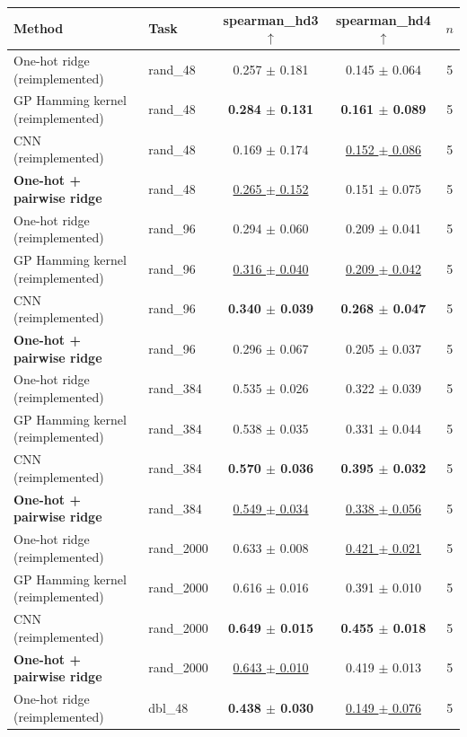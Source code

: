 \begin{tabular}{llccc}
\toprule
Method & Task & spearman\_hd3 $\uparrow$ & spearman\_hd4 $\uparrow$ & $n$ \\
\midrule
One-hot ridge (reimplemented) & rand\_48 & 0.257 $\pm$ 0.181 & 0.145 $\pm$ 0.064 & 5 \\
GP Hamming kernel (reimplemented) & rand\_48 & \textbf{0.284 $\pm$ 0.131} & \textbf{0.161 $\pm$ 0.089} & 5 \\
CNN (reimplemented) & rand\_48 & 0.169 $\pm$ 0.174 & \underline{0.152 $\pm$ 0.086} & 5 \\
\textbf{One-hot + pairwise ridge} & rand\_48 & \underline{0.265 $\pm$ 0.152} & 0.151 $\pm$ 0.075 & 5 \\
\midrule
One-hot ridge (reimplemented) & rand\_96 & 0.294 $\pm$ 0.060 & 0.209 $\pm$ 0.041 & 5 \\
GP Hamming kernel (reimplemented) & rand\_96 & \underline{0.316 $\pm$ 0.040} & \underline{0.209 $\pm$ 0.042} & 5 \\
CNN (reimplemented) & rand\_96 & \textbf{0.340 $\pm$ 0.039} & \textbf{0.268 $\pm$ 0.047} & 5 \\
\textbf{One-hot + pairwise ridge} & rand\_96 & 0.296 $\pm$ 0.067 & 0.205 $\pm$ 0.037 & 5 \\
\midrule
One-hot ridge (reimplemented) & rand\_384 & 0.535 $\pm$ 0.026 & 0.322 $\pm$ 0.039 & 5 \\
GP Hamming kernel (reimplemented) & rand\_384 & 0.538 $\pm$ 0.035 & 0.331 $\pm$ 0.044 & 5 \\
CNN (reimplemented) & rand\_384 & \textbf{0.570 $\pm$ 0.036} & \textbf{0.395 $\pm$ 0.032} & 5 \\
\textbf{One-hot + pairwise ridge} & rand\_384 & \underline{0.549 $\pm$ 0.034} & \underline{0.338 $\pm$ 0.056} & 5 \\
\midrule
One-hot ridge (reimplemented) & rand\_2000 & 0.633 $\pm$ 0.008 & \underline{0.421 $\pm$ 0.021} & 5 \\
GP Hamming kernel (reimplemented) & rand\_2000 & 0.616 $\pm$ 0.016 & 0.391 $\pm$ 0.010 & 5 \\
CNN (reimplemented) & rand\_2000 & \textbf{0.649 $\pm$ 0.015} & \textbf{0.455 $\pm$ 0.018} & 5 \\
\textbf{One-hot + pairwise ridge} & rand\_2000 & \underline{0.643 $\pm$ 0.010} & 0.419 $\pm$ 0.013 & 5 \\
\midrule
One-hot ridge (reimplemented) & dbl\_48 & \textbf{0.438 $\pm$ 0.030} & \underline{0.149 $\pm$ 0.076} & 5 \\

\end{tabular}
